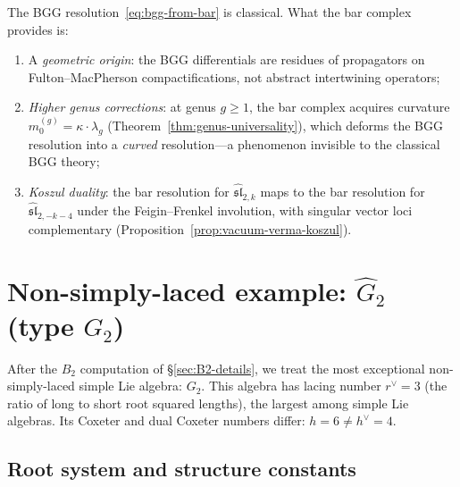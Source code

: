 \begin{remark}
\label{rem:bar-adds-to-bgg}
The BGG resolution~\eqref{eq:bgg-from-bar} is classical.  What the
bar complex provides is:
\begin{enumerate}[label=\textup{(\alph*)}]
\item A \emph{geometric origin}: the BGG differentials are residues
  of propagators on Fulton--MacPherson compactifications, not
  abstract intertwining operators;
\item \emph{Higher genus corrections}: at genus $g \geq 1$, the bar
  complex acquires curvature $m_0^{(g)} = \kappa \cdot \lambda_g$
  (Theorem~\ref{thm:genus-universality}), which deforms the BGG
  resolution into a \emph{curved} resolution---a phenomenon invisible
  to the classical BGG theory;
\item \emph{Koszul duality}: the bar resolution for
  $\widehat{\mathfrak{sl}}_{2,k}$ maps to the bar resolution for
  $\widehat{\mathfrak{sl}}_{2,-k-4}$ under the Feigin--Frenkel
  involution, with singular vector loci complementary
  (Proposition~\ref{prop:vacuum-verma-koszul}).
\end{enumerate}
\end{remark}


\section{\texorpdfstring{Non-simply-laced example: $\widehat{G}_2$
(type $G_2$)}{Non-simply-laced example: G-2 (type G-2)}}
\label{sec:G2-details}

After the $B_2$ computation of \S\ref{sec:B2-details},
we treat the most exceptional non-simply-laced simple Lie
algebra: $G_2$.  This algebra has lacing number $r^\vee = 3$
(the ratio of long to short root squared lengths), the largest
among simple Lie algebras.  Its Coxeter and dual Coxeter numbers
differ: $h = 6 \neq h^\vee = 4$.

\subsection{Root system and structure constants}

